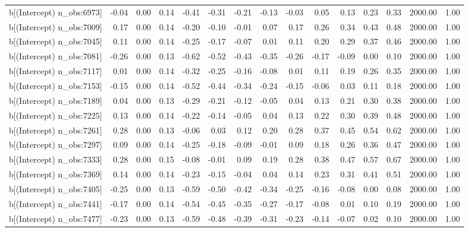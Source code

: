 \begin{table}[ht]
\begin{tabular}{rrrrrrrrrrrrrrr}
  b[(Intercept) n\_obs:6973] & -0.04 & 0.00 & 0.14 & -0.41 & -0.31 & -0.21 & -0.13 & -0.03 & 0.05 & 0.13 & 0.23 & 0.33 & 2000.00 & 1.00 \\ 
  b[(Intercept) n\_obs:7009] & 0.17 & 0.00 & 0.14 & -0.20 & -0.10 & -0.01 & 0.07 & 0.17 & 0.26 & 0.34 & 0.43 & 0.48 & 2000.00 & 1.00 \\ 
  b[(Intercept) n\_obs:7045] & 0.11 & 0.00 & 0.14 & -0.25 & -0.17 & -0.07 & 0.01 & 0.11 & 0.20 & 0.29 & 0.37 & 0.46 & 2000.00 & 1.00 \\ 
  b[(Intercept) n\_obs:7081] & -0.26 & 0.00 & 0.13 & -0.62 & -0.52 & -0.43 & -0.35 & -0.26 & -0.17 & -0.09 & 0.00 & 0.10 & 2000.00 & 1.00 \\ 
  b[(Intercept) n\_obs:7117] & 0.01 & 0.00 & 0.14 & -0.32 & -0.25 & -0.16 & -0.08 & 0.01 & 0.11 & 0.19 & 0.26 & 0.35 & 2000.00 & 1.00 \\ 
  b[(Intercept) n\_obs:7153] & -0.15 & 0.00 & 0.14 & -0.52 & -0.44 & -0.34 & -0.24 & -0.15 & -0.06 & 0.03 & 0.11 & 0.18 & 2000.00 & 1.00 \\ 
  b[(Intercept) n\_obs:7189] & 0.04 & 0.00 & 0.13 & -0.29 & -0.21 & -0.12 & -0.05 & 0.04 & 0.13 & 0.21 & 0.30 & 0.38 & 2000.00 & 1.00 \\ 
  b[(Intercept) n\_obs:7225] & 0.13 & 0.00 & 0.14 & -0.22 & -0.14 & -0.05 & 0.04 & 0.13 & 0.22 & 0.30 & 0.39 & 0.48 & 2000.00 & 1.00 \\ 
  b[(Intercept) n\_obs:7261] & 0.28 & 0.00 & 0.13 & -0.06 & 0.03 & 0.12 & 0.20 & 0.28 & 0.37 & 0.45 & 0.54 & 0.62 & 2000.00 & 1.00 \\ 
  b[(Intercept) n\_obs:7297] & 0.09 & 0.00 & 0.14 & -0.25 & -0.18 & -0.09 & -0.01 & 0.09 & 0.18 & 0.26 & 0.36 & 0.47 & 2000.00 & 1.00 \\ 
  b[(Intercept) n\_obs:7333] & 0.28 & 0.00 & 0.15 & -0.08 & -0.01 & 0.09 & 0.19 & 0.28 & 0.38 & 0.47 & 0.57 & 0.67 & 2000.00 & 1.00 \\ 
  b[(Intercept) n\_obs:7369] & 0.14 & 0.00 & 0.14 & -0.23 & -0.15 & -0.04 & 0.04 & 0.14 & 0.23 & 0.31 & 0.41 & 0.51 & 2000.00 & 1.00 \\ 
  b[(Intercept) n\_obs:7405] & -0.25 & 0.00 & 0.13 & -0.59 & -0.50 & -0.42 & -0.34 & -0.25 & -0.16 & -0.08 & 0.00 & 0.08 & 2000.00 & 1.00 \\ 
  b[(Intercept) n\_obs:7441] & -0.17 & 0.00 & 0.14 & -0.54 & -0.45 & -0.35 & -0.27 & -0.17 & -0.08 & 0.01 & 0.10 & 0.19 & 2000.00 & 1.00 \\ 
  b[(Intercept) n\_obs:7477] & -0.23 & 0.00 & 0.13 & -0.59 & -0.48 & -0.39 & -0.31 & -0.23 & -0.14 & -0.07 & 0.02 & 0.10 & 2000.00 & 1.00 \\ 

\end{tabular}
\end{table}
